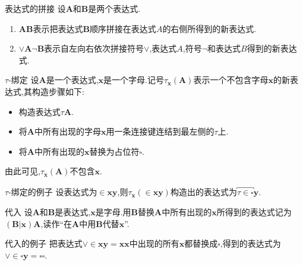 \begin{definition}{表达式的拼接}{}
	设$\boldsymbol{A}$和$\boldsymbol{B}$是两个表达式.
	\begin{enumerate}
		\item $\boldsymbol{A}\boldsymbol{B}$表示把表达式$\boldsymbol{B}$顺序拼接在表达式$A$的右侧所得到的新表达式.
		\item $\vee\boldsymbol{A}\neg\boldsymbol{B}$表示自左向右依次拼接符号$\vee$,表达式$A$,符号$\neg$和表达式$B$得到的新表达式.
	\end{enumerate}
\end{definition}

\begin{definition}{$\tau$-绑定}{}
	设$\boldsymbol{A}$是一个表达式,$\boldsymbol{x}$是一个字母.记号$\tau_{\boldsymbol{x}}\left(\boldsymbol{A}\right)$表示一个不包含字母$\boldsymbol{x}$的新表达式,其构造步骤如下:
	\begin{itemize}
		\item 构造表达式$\tau\boldsymbol{A}$.
		\item 将$\boldsymbol{A}$中所有出现的字母$\boldsymbol{x}$用一条连接键连结到最左侧的$\tau$上.
		\item 将$\boldsymbol{A}$中所有出现的$\boldsymbol{x}$替换为占位符$\square$.
	\end{itemize} 
\end{definition}

由此可见,$\tau_{\boldsymbol{x}}\left(\boldsymbol{A}\right)$不包含$\boldsymbol{x}$.

\begin{example}{$\tau$-绑定的例子}{}
	设表达式为$\in \boldsymbol{x}\boldsymbol{y}$,则$\tau_{\boldsymbol{x}}\left(\in\boldsymbol{x}\boldsymbol{y}\right)$构造出的表达式为$\overbracket{\tau\in \square}^{\quad}\boldsymbol{y}$.
\end{example}

\begin{definition}{代入}{}
	设$\boldsymbol{A}$和$\boldsymbol{B}$是表达式,$\boldsymbol{x}$是字母.用$\boldsymbol{B}$替换$\boldsymbol{A}$中所有出现的$\boldsymbol{x}$所得到的表达式记为$\left(\boldsymbol{B}|\boldsymbol{x}\right)\boldsymbol{A}$,读作``在$\boldsymbol{A}$中用$\boldsymbol{B}$代替$\boldsymbol{x}$''.
\end{definition}

\begin{example}{代入的例子}{}
	把表达式$\vee\in\boldsymbol{x}\boldsymbol{y}=\boldsymbol{x}\boldsymbol{x}$中出现的所有$\boldsymbol{x}$都替换成$\square$,得到的表达式为$\vee\in\square\boldsymbol{y}=\square\square$.
\end{example}

